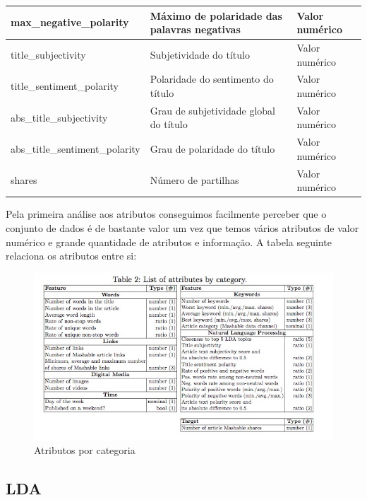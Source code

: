 \begin{table}
{\begin{tabular}{|l|l|l|}
max\_negative\_polarity          & Máximo de polaridade das palavras negativas                                                   & Valor numérico \\ \hline
title\_subjectivity              & Subjetividade do título                                                                       & Valor numérico \\ \hline
title\_sentiment\_polarity       & Polaridade do sentimento do título                                                            & Valor numérico \\ \hline
abs\_title\_subjectivity         & Grau de subjetividade global do título                                                        & Valor numérico \\ \hline
abs\_title\_sentiment\_polarity  & Grau de polaridade do título                                                                  & Valor numérico \\ \hline
shares                           & Número de partilhas                                                                           & Valor numérico \\ \hline
\end{tabular}}
\end{table}
\newpage
Pela primeira análise aos atributos conseguimos facilmente perceber que o conjunto de dados é de bastante valor um vez que temos vários atributos de valor numérico e grande quantidade de atributos e informação. A tabela seguinte relaciona os atributos entre si:

\begin{figure}[H]
    \centering
    \includegraphics[scale=0.5]{tex/img/img1o.jpg}
    \caption{Atributos por categoria}
    \label{fig:atributosOn}
\end{figure}


\subsection{LDA}

